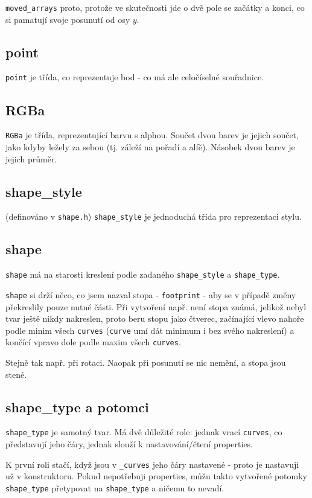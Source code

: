 \documentclass[11pt]{article} %
\begin{document}
\texttt{moved\_arrays} proto, protože ve skutečnosti jde o dvě pole se začátky a konci, co si pamatují svoje posunutí od osy $y$.

\subsection{point}
\texttt{point} je třída, co reprezentuje bod - co má ale celočíselné souřadnice.

\subsection{RGBa}
\texttt{RGBa} je třída, reprezentující barvu s alphou. Součet dvou barev je jejich součet, jako kdyby ležely za sebou (tj. záleží na pořadí a alfě). Násobek dvou barev je jejich průměr.

\subsection{shape\_style}
(definováno v \texttt{shape.h})
\texttt{shape\_style} je jednoduchá třída pro reprezentaci stylu.

\subsection{shape}
\texttt{shape} má na starosti kreslení podle zadaného \texttt{shape\_style} a \texttt{shape\_type}.

\texttt{shape} si drží něco, co jsem nazval stopa - \texttt{footprint} - aby se v případě změny překreslily pouze nutné části. Při vytvoření např. není stopa známá, jelikož nebyl tvar ještě nikdy nakreslen, proto beru stopu jako čtverec, začínající vlevo nahoře podle minim všech \texttt{curves} (\texttt{curve} umí dát minimum i bez svého nakreslení) a končící vpravo dole podle maxim všech \texttt{curves}.

Stejně tak např. při rotaci. Naopak při posunutí se nic nemění,  a  stopa jsou stené.

\subsection{shape\_type a potomci}
\texttt{shape\_type} je samotný tvar. Má dvě důležité role: jednak vrací \texttt{curves}, co představují jeho čáry, jednak slouží k nastavování/čtení properties.

K první roli stačí, když jsou v \texttt{\_curves} jeho čáry nastavené - proto je nastavuji už v konstruktoru. Pokud nepotřebuji properties, můžu takto vytvořené potomky \texttt{shape\_type} přetypovat na \texttt{shape\_type} a ničemu to nevadí.
\end{document}
